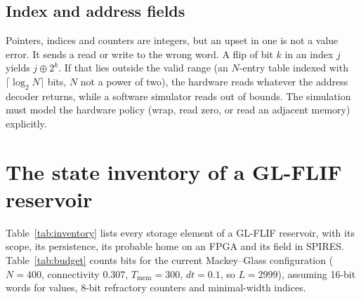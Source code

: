 \documentclass[11pt,a4paper]{article}
\begin{document}
\subsection{Index and address fields}

Pointers, indices and counters are integers, but an upset in one is not a value error. It sends a read or write to the wrong word. A flip of bit $k$ in an index $j$ yields $j \oplus 2^{k}$. If that lies outside the valid range (an $N$-entry table indexed with $\lceil \log_2 N \rceil$ bits, $N$ not a power of two), the hardware reads whatever the address decoder returns, while a software simulator reads out of bounds. The simulation must model the hardware policy (wrap, read zero, or read an adjacent memory) explicitly.

\section{The state inventory of a GL-FLIF reservoir}
\label{sec:inventory}

Table~\ref{tab:inventory} lists every storage element of a GL-FLIF reservoir, with its scope, its persistence, its probable home on an FPGA and its field in SPIRES. Table~\ref{tab:budget} counts bits for the current Mackey--Glass configuration ($N = 400$, connectivity 0.307, $T_{\mathrm{mem}} = 300$, $dt = 0.1$, so $L = 2999$), assuming 16-bit words for values, 8-bit refractory counters and minimal-width indices.
\end{document}
